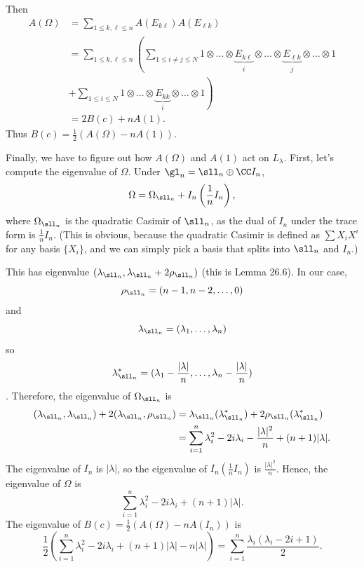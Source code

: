 \documentclass[11pt, headheight=30pt]{scrartcl}
\begin{document}
Then
\begin{align*}
    A(\Omega) &= \sum_{1\leq k,\ell \leq n} A(E_{k\ell})A(E_{\ell k})\\
    &= \sum_{1\leq k,\ell \leq n}\left( \sum_{1\leq i\neq j \leq N} 1\otimes \dots \otimes \underbrace{E_{k\ell}}_i \otimes \dots \otimes \underbrace{E_{\ell k}}_j \otimes \dots \otimes 1\right.\\
    & + \left.\sum_{1\leq i\leq N} 1\otimes \dots \otimes \underbrace{E_{kk}}_i \otimes \dots \otimes 1\right)\\
    &= 2 B(c) + n A(1).
\end{align*}
Thus $B(c) = \frac12\left(A(\Omega) - nA(1)\right)$.

Finally, we have to figure out how $A(\Omega)$ and $A(1)$ act on $L_\lambda$.
First, let's compute the eigenvalue of $\Omega$. Under $\gl_n = \sll_n \oplus \CC I_n$,
\[
    \Omega = \Omega_{\sll_n} + I_n\left(\frac1n I_n\right),
\]
where $\Omega_{\sll_n}$ is the quadratic Casimir of $\sll_n$, as the dual of $I_n$ under the trace form is $\frac1n I_n$. (This is obvious, because the quadratic Casimir is defined as $\sum X_i X^i$ for any basis $\{X_i\}$, and we can simply pick a basis that splits into $\sll_n$ and $I_n$.)

This has eigenvalue $(\lambda_{\sll_n}, \lambda_{\sll_n} + 2\rho_{\sll_n})$ (this is Lemma 26.6). In our case,
\[
    \rho_{\sll_n} = (n-1, n-2, \ldots, 0)
\]
and
\[
    \lambda_{\sll_n} = (\lambda_1, \ldots, \lambda_n)
\]
so
\[
    \lambda_{\sll_n}^* = (\lambda_1 - \frac{|\lambda|}n, \ldots, \lambda_n - \frac{|\lambda|}n)
\].
Therefore, the eigenvalue of $\Omega_{\sll_n}$ is
\begin{align*}
    (\lambda_{\sll_n}, \lambda_{\sll_n}) + 2(\lambda_{\sll_n}, \rho_{\sll_n}) &= \lambda_{\sll_n}(\lambda_{\sll_n}^*) + 2\rho_{\sll_n}(\lambda_{\sll_n}^*)\\
    &= \sum_{i=1}^n \lambda_i^2 - 2i\lambda_i - \frac{|\lambda|^2}n + (n+1)|\lambda|.
\end{align*}
The eigenvalue of $I_n$ is $|\lambda|$, so the eigenvalue of $I_n(\frac1n I_n)$ is $\frac{|\lambda|^2}n$. Hence, the eigenvalue of $\Omega$ is
\[
    \sum_{i=1}^n \lambda_i^2 - 2i\lambda_i + (n+1)|\lambda|.
\]
The eigenvalue of $B(c) = \frac12(A(\Omega) - nA(I_n))$ is
\[
    \frac12\left(\sum_{i=1}^n \lambda_i^2 - 2i\lambda_i + (n+1)|\lambda| - n|\lambda|\right) = \sum_{i=1}^n \frac{\lambda_i(\lambda_i - 2i + 1)}2.
\]
\end{document}
